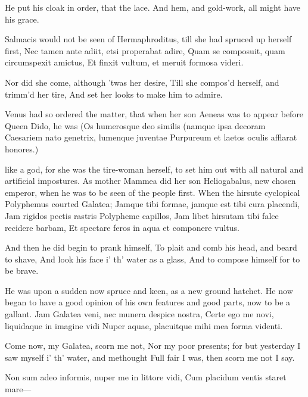 {He put his cloak in order, that the lace.
And hem, and gold-work, all might have his grace.

Salmacis would not be seen of Hermaphroditus, till she had spruced up
herself first,
Nec tamen ante adiit, etsi properabat adire,
Quam se composuit, quam circumspexit amictus,
Et finxit vultum, et meruit formosa videri.

Nor did she come, although 'twas her desire,
Till she compos'd herself, and trimm'd her tire,
And set her looks to make him to admire.

Venus had so ordered the matter, that when her son Aeneas was to
appear before Queen Dido, he was
(Os humerosque deo similis (namque ipsa decoram
Caesariem nato genetrix, lumenque juventae
Purpureum et laetos oculis afflarat honores.)

like a god, for she was the tire-woman herself, to set him out with all
natural and artificial impostures. As mother Mammea did her son
Heliogabalus, new chosen emperor, when he was to be seen of the people
first. When the hirsute cyclopical Polyphemus courted Galatea;
Jamque tibi formae, jamque est tibi cura placendi,
Jam rigidos pectis rastris Polypheme capillos,
Jam libet hirsutam tibi falce recidere barbam,
Et spectare feros in aqua et componere vultus.

And then he did begin to prank himself,
To plait and comb his head, and beard to shave,
And look his face i' th' water as a glass,
And to compose himself for to be brave.

He was upon a sudden now spruce and keen, as a new ground hatchet. He
now began to have a good opinion of his own features and good parts,
now to be a gallant.
Jam Galatea veni, nec munera despice nostra,
Certe ego me novi, liquidaque in imagine vidi
Nuper aquae, placuitque mihi mea forma videnti.

Come now, my Galatea, scorn me not,
Nor my poor presents; for but yesterday
I saw myself i' th' water, and methought
Full fair I was, then scorn me not I say.

Non sum adeo informis, nuper me in littore vidi,
Cum placidum ventis staret mare---

}
